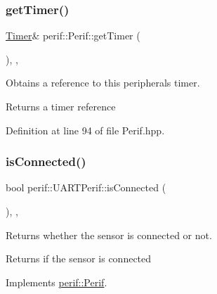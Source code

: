 \subsubsection{\texorpdfstring{getTimer()}{getTimer()}}
{\footnotesize\ttfamily \mbox{\hyperlink{classTimer}{Timer}}\& perif\+::\+Perif\+::get\+Timer (\begin{DoxyParamCaption}{ }\end{DoxyParamCaption})\hspace{0.3cm}{\ttfamily [inline]}, {\ttfamily [protected]}, {\ttfamily [inherited]}}

Obtains a reference to this peripheral\textquotesingle{}s timer.

\begin{DoxyReturn}{Returns}
a timer reference 
\end{DoxyReturn}


Definition at line 94 of file Perif.\+hpp.


\begin{DoxyCode}{0}

\end{DoxyCode}
\mbox{\label{classperif_1_1UARTPerif_a14c1fdcd81cd9a5eac9d4c0ac9863b66}} 
\subsubsection{\texorpdfstring{isConnected()}{isConnected()}}
{\footnotesize\ttfamily bool perif\+::\+U\+A\+R\+T\+Perif\+::is\+Connected (\begin{DoxyParamCaption}{ }\end{DoxyParamCaption})\hspace{0.3cm}{\ttfamily [inline]}, {\ttfamily [override]}, {\ttfamily [virtual]}}

Returns whether the sensor is connected or not.

\begin{DoxyReturn}{Returns}
if the sensor is connected 
\end{DoxyReturn}


Implements \mbox{\hyperlink{classperif_1_1Perif_ab9a17fad04e595f3ac0c78b9d3be4c9e}{perif\+::\+Perif}}.



